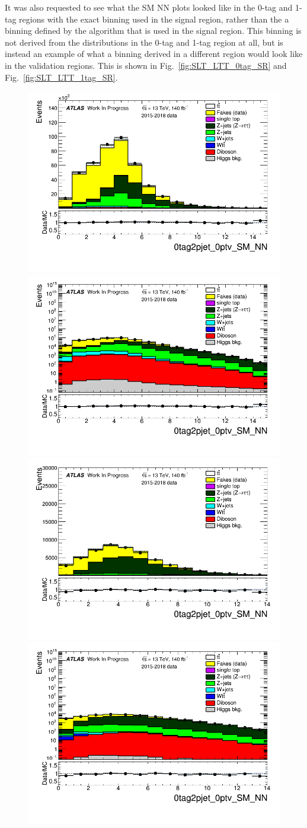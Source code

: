 It was also requested to see what the SM NN plots looked like in the 0-tag and 1-tag regions with the exact binning used in the signal region, rather than the a binning defined by the algorithm that is used in the signal region.  This binning is not derived from the distributions in the 0-tag and 1-tag region at all, but is instead an example of what a binning derived in a different region would look like in the validation regions.  This is shown in Fig.~\ref{fig:SLT_LTT_0tag_SR} and Fig.~\ref{fig:SLT_LTT_1tag_SR}.  

\begin{figure}
\centering
\includegraphics[width=.45\textwidth]{figures/lephadFF/SLT/0tag2pjet_0ptv_SM_NN_SLT_ALLFAKES_Bulb_SRbinning_lin.png}
\includegraphics[width=.45\textwidth]{figures/lephadFF/SLT/0tag2pjet_0ptv_SM_NN_SLT_ALLFAKES_Bulb_SRbinning_log.png}\\
\includegraphics[width=.45\textwidth]{figures/lephadFF/LTT/0tag2pjet_0ptv_SM_NN_LTT_ALLFAKES_Bulb_SRbinning_lin.png}
\includegraphics[width=.45\textwidth]{figures/lephadFF/LTT/0tag2pjet_0ptv_SM_NN_LTT_ALLFAKES_Bulb_SRbinning_log.png}\\

\end{figure}
